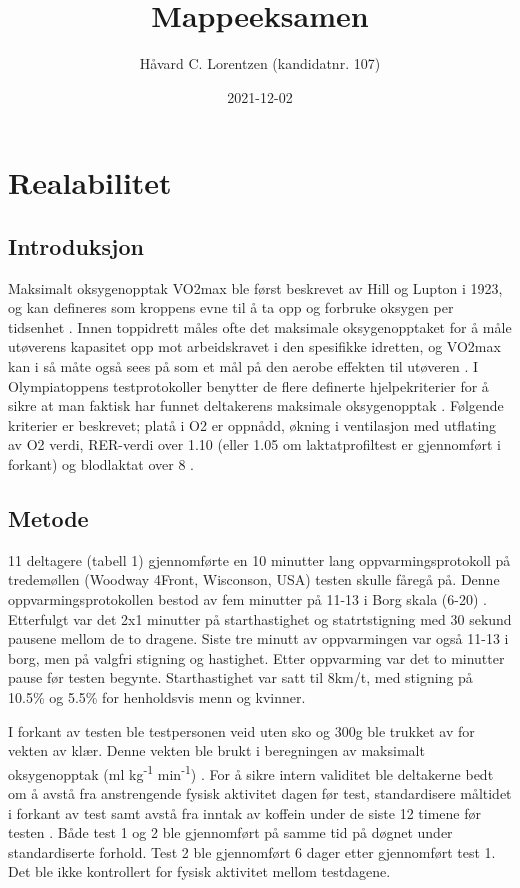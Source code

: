 \documentclass[
]{book}
\title{Mappeeksamen}
\author{Håvard C. Lorentzen (kandidatnr. 107)}
\date{2021-12-02}
\begin{document}
\maketitle

{
\setcounter{tocdepth}{1}
\tableofcontents
}
\hypertarget{realabilitet}{%
\chapter{Realabilitet}\label{realabilitet}}

\hypertarget{introduksjon}{%
\section{Introduksjon}\label{introduksjon}}

Maksimalt oksygenopptak VO2max ble først beskrevet av Hill og Lupton i 1923, og kan defineres som kroppens evne til å ta opp og forbruke oksygen per tidsenhet \citep{bassett2000, hill1923}. Innen toppidrett måles ofte det maksimale oksygenopptaket for å måle utøverens kapasitet opp mot arbeidskravet i den spesifikke idretten, og VO2max kan i så måte også sees på som et mål på den aerobe effekten til utøveren \citep{bassett2000}. I Olympiatoppens testprotokoller benytter de flere definerte hjelpekriterier for å sikre at man faktisk har funnet deltakerens maksimale oksygenopptak \citep{tønnessen2017}. Følgende kriterier er beskrevet; platå i O2 er oppnådd, økning i ventilasjon med utflating av O2 verdi, RER-verdi over 1.10 (eller 1.05 om laktatprofiltest er gjennomført i forkant) og blodlaktat over 8 \citep{tønnessen2017}.

\hypertarget{metode}{%
\section{Metode}\label{metode}}

11 deltagere (tabell 1) gjennomførte en 10 minutter lang oppvarmingsprotokoll på tredemøllen (Woodway 4Front, Wisconson, USA) testen skulle fåregå på. Denne oppvarmingsprotokollen bestod av fem minutter på 11-13 i Borg skala (6-20) \citep{borg1982}. Etterfulgt var det 2x1 minutter på starthastighet og statrtstigning med 30 sekund pausene mellom de to dragene. Siste tre minutt av oppvarmingen var også 11-13 i borg, men på valgfri stigning og hastighet. Etter oppvarming var det to minutter pause før testen begynte. Starthastighet var satt til 8km/t, med stigning på 10.5\% og 5.5\% for henholdsvis menn og kvinner.

I forkant av testen ble testpersonen veid uten sko og 300g ble trukket av for vekten av klær. Denne vekten ble brukt i beregningen av maksimalt oksygenopptak (ml kg\textsuperscript{-1} min\textsuperscript{-1}) . For å sikre intern validitet ble deltakerne bedt om å avstå fra anstrengende fysisk aktivitet dagen før test, standardisere måltidet i forkant av test samt avstå fra inntak av koffein under de siste 12 timene før testen \citep{halperin2015}. Både test 1 og 2 ble gjennomført på samme tid på døgnet under standardiserte forhold. Test 2 ble gjennomført 6 dager etter gjennomført test 1. Det ble ikke kontrollert for fysisk aktivitet mellom testdagene.
\end{document}
